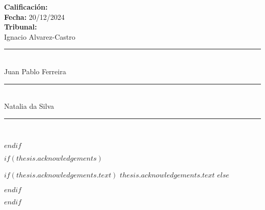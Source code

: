     \begin{flushleft}
    \textbf{Calificación:} \\
    \vspace{0.8cm}
    \textbf{Fecha:} 20/12/2024\\
    \vspace{1cm}
    \textbf{Tribunal:}\\
    \vspace{0.8cm}
    Ignacio Alvarez-Castro {\rule{0.5\textwidth}{.4pt}}\\
    \vspace{0.8cm}
    Juan Pablo Ferreira{\rule{0.5\textwidth}{.4pt}}\\
    \vspace{0.8cm}
    Natalia da Silva {\rule{0.5\textwidth}{.4pt}}\\

    \end{flushleft}

$endif$

$if(thesis.acknowledgements)$

\begin{acknowledgements}
\addchaptertocentry{\acknowledgementname} %
$if(thesis.acknowledgements.text)$
$thesis.acknowledgements.text$
$else$

$endif$
\end{acknowledgements}

$endif$


\begingroup
\hypersetup{linkcolor=$if(toclinkcolor)$$toclinkcolor$$else$black$endif$}






\renewcommand{\chaptername}{Capítulo}
\renewcommand{\tablename}{Tabla}
\renewcommand{\contentsname}{Índice}
\renewcommand{\listfigurename}{Lista de Figuras}
\renewcommand{\listtablename}{Lista de Tablas}



